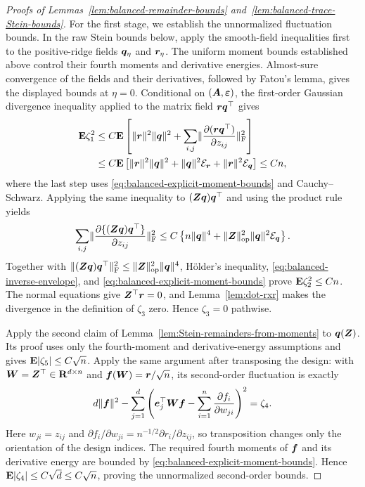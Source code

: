\documentclass{article}
\theoremstyle{plain} %
\theoremstyle{definition} %
\theoremstyle{definition} %
\begin{document}
\begin{proof}[Proofs of Lemmas~\ref{lem:balanced-remainder-bounds}
and~\ref{lem:balanced-trace-Stein-bounds}]
For the first stage, we establish the unnormalized fluctuation bounds.
In the raw Stein bounds below, apply the smooth-field inequalities first to
the positive-ridge fields $\boldsymbol{q}_\eta$ and $\boldsymbol{r}_\eta$. The uniform moment
bounds established above control their fourth moments and derivative
energies. Almost-sure convergence of the fields and their derivatives,
followed by Fatou's lemma, gives the displayed bounds at $\eta=0$.
Conditional on $(\boldsymbol{A},{\boldsymbol{\varepsilon} })$, the first-order Gaussian divergence
inequality applied to the matrix field $\boldsymbol{r}\boldsymbol{q}^\top$ gives
\begin{align*}
    {\mathbf{E}}\zeta_1^2
    &\leq C{\mathbf{E}}\left[
       \lVert\boldsymbol{r}\rVert^2\lVert\boldsymbol{q}\rVert^2
       +\sum_{i,j}
          \lVert\pdv{(\boldsymbol{r}\boldsymbol{q}^\top)}{z_{ij}}\rVert_{\rm F}^2
    \right]\\
    &\leq C{\mathbf{E}}\left[
       \lVert\boldsymbol{r}\rVert^2\lVert\boldsymbol{q}\rVert^2
       +\lVert\boldsymbol{q}\rVert^2{\mathcal E}_{\boldsymbol{r}}
       +\lVert\boldsymbol{r}\rVert^2{\mathcal E}_{\boldsymbol{q}}
    \right]
    \leq Cn,
\end{align*}
where the last step uses \eqref{eq:balanced-explicit-moment-bounds} and
Cauchy--Schwarz.  Applying the same inequality to
$(\boldsymbol{Z}\boldsymbol{q})\boldsymbol{q}^\top$ and using the product rule yields
\begin{align*}
    \sum_{i,j}
       \lVert\pdv{\{(\boldsymbol{Z}\boldsymbol{q})\boldsymbol{q}^\top\}}{z_{ij}}\rVert_{\rm F}^2
    \leq C\left\{
       n\lVert\boldsymbol{q}\rVert^4
       +\lVert\boldsymbol{Z}\rVert_{\rm op}^2\lVert\boldsymbol{q}\rVert^2{\mathcal E}_{\boldsymbol{q}}
    \right\}.
\end{align*}
Together with
$\lVert(\boldsymbol{Z}\boldsymbol{q})\boldsymbol{q}^\top\rVert_{\rm F}^2
 \leq\lVert\boldsymbol{Z}\rVert_{\rm op}^2\lVert\boldsymbol{q}\rVert^4$,
H\"older's inequality, \eqref{eq:balanced-inverse-envelope}, and
\eqref{eq:balanced-explicit-moment-bounds} prove
${\mathbf{E}}\zeta_2^2\leq Cn$.  The normal equations give
$\boldsymbol{Z}^\top\boldsymbol{r}=0$, and Lemma~\ref{lem:dot-rxr} makes the
divergence in the definition of $\zeta_3$ zero.  Hence $\zeta_3=0$ pathwise.

Apply the second claim of
Lemma~\ref{lem:Stein-remainders-from-moments} to $\boldsymbol{q}(\boldsymbol{Z})$.  Its proof uses
only the fourth-moment and derivative-energy assumptions and gives
${\mathbf{E}}|\zeta_5|\leq C\sqrt n$.  Apply the same argument
after transposing the design: with $\boldsymbol{W}=\boldsymbol{Z}^\top\in{\mathbf{R}}^{d\times n}$ and
$\boldsymbol{f}(\boldsymbol{W})=\boldsymbol{r}/\sqrt n$, its second-order fluctuation is exactly
\begin{align*}
    d\lVert\boldsymbol{f}\rVert^2
    -\sum_{j=1}^d\left(
       \boldsymbol{e}_j^\top\boldsymbol{W}\boldsymbol{f}
       -\sum_{i=1}^n\pdv{f_i}{w_{ji}}
    \right)^2
    =\zeta_4.
\end{align*}
Here $w_{ji}=z_{ij}$ and
$\partial f_i/\partial w_{ji}
=n^{-1/2}\partial r_i/\partial z_{ij}$, so transposition
changes only the orientation of the design indices.
The required fourth moments of $\boldsymbol{f}$ and its derivative energy are bounded
by \eqref{eq:balanced-explicit-moment-bounds}.  Hence
${\mathbf{E}}|\zeta_4|\leq C\sqrt d\leq C\sqrt n$, proving the unnormalized
second-order bounds.


\end{proof}
\end{document}

